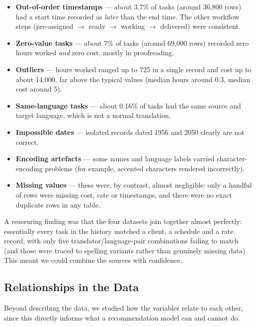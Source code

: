 \documentclass[9pt,a4paper,twoside]{utils/tau-class/tau}
\begin{document}
\begin{itemize}
    \item \textbf{Out-of-order timestamps} --- about 3.7\% of tasks (around 36,800 rows) had a start time recorded as \emph{later} than the end time. The other workflow steps (pre-assigned $\rightarrow$ ready $\rightarrow$ working $\rightarrow$ delivered) were consistent.
    \item \textbf{Zero-value tasks} --- about 7\% of tasks (around 69,000 rows) recorded zero hours worked \emph{and} zero cost, mostly in proofreading.
    \item \textbf{Outliers} --- hours worked ranged up to 725 in a single record and cost up to about 14,000, far above the typical values (median hours around 0.3, median cost around 5).
    \item \textbf{Same-language tasks} --- about 0.16\% of tasks had the same source and target language, which is not a normal translation.
    \item \textbf{Impossible dates} --- isolated records dated 1956 and 2050 clearly are not correct.
    \item \textbf{Encoding artefacts} --- some names and language labels carried character-encoding problems (for example, accented characters rendered incorrectly).
    \item \textbf{Missing values} --- these were, by contrast, almost negligible: only a handful of rows were missing cost, rate or timestamps, and there were no exact duplicate rows in any table.
\end{itemize}

A reassuring finding was that the four datasets join together almost perfectly: essentially every task in the history matched a client, a schedule and a rate record, with only five translator/language-pair combinations failing to match (and those were traced to spelling variants rather than genuinely missing data). This meant we could combine the sources with confidence.

\subsection{Relationships in the Data}

Beyond describing the data, we studied how the variables relate to each other, since this directly informs what a recommendation model can and cannot do.
\end{document}
